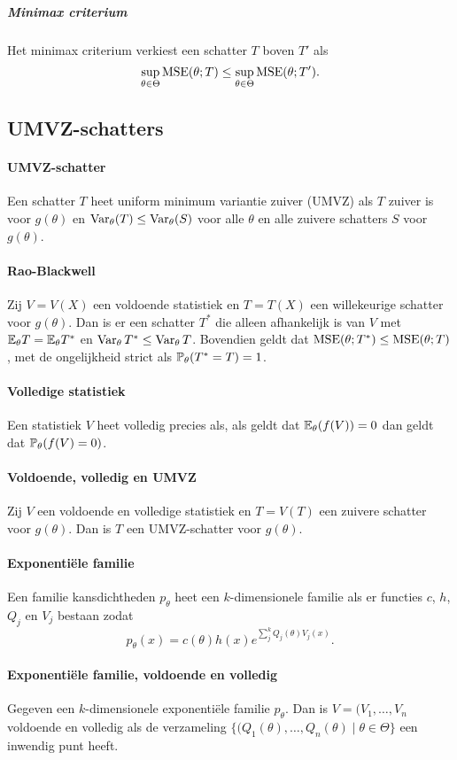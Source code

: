 \subparagraph{Minimax criterium} Het minimax criterium verkiest een schatter \(T\) boven \(T'\) als
\[
    \sup_{\theta\in\Theta}\operatorname{MSE}(\theta; T)\leq\sup_{\theta\in\Theta}\operatorname{MSE}(\theta;T').
\]

\subsection{UMVZ-schatters}
\paragraph{UMVZ-schatter} Een schatter \(T\) heet uniform minimum variantie zuiver (UMVZ) als \(T\) zuiver is voor \(g(\theta)\) en \(\operatorname{Var}_{\theta}(T)\leq\operatorname{Var}_{\theta}(S)\) voor alle \(\theta\) en alle zuivere schatters \(S\) voor \(g(\theta)\).

\paragraph{Rao-Blackwell} Zij \(V=V(X)\) een voldoende statistiek en \(T=T(X)\) een willekeurige schatter voor \(g(\theta)\). Dan is er een schatter \(T^{*}\) die alleen afhankelijk is van \(V\) met \(\mathbb{E}_{\theta}T=\mathbb{E}_{\theta}T^{*}\) en \(\operatorname{Var}_{\theta}T^{*}\leq\operatorname{Var}_{\theta}T\). Bovendien geldt dat \(\operatorname{MSE}(\theta;T^{*})\leq\operatorname{MSE}(\theta;T)\), met de ongelijkheid strict als \(\mathbb{P}_{\theta}(T^{*}=T)=1\).

\paragraph{Volledige statistiek} Een statistiek \(V\) heet volledig precies als, als geldt dat \(\mathbb{E}_{\theta}(f(V))=0\) dan geldt dat \(\mathbb{P}_{\theta}(f(V)=0)\).

\paragraph{Voldoende, volledig en UMVZ} Zij \(V\) een voldoende en volledige statistiek en \(T=V(T)\) een zuivere schatter voor \(g(\theta)\). Dan is \(T\) een UMVZ-schatter voor \(g(\theta)\).

\paragraph{Exponentiële familie} Een familie kansdichtheden \(p_{\theta}\) heet een \(k\)-dimensionele familie als er functies \(c\), \(h\), \(Q_{j}\) en \(V_{j}\) bestaan zodat
\[
    p_{\theta}(x)=c(\theta)h(x)e^{\sum_{j}^{k}Q_{j}(\theta)V_{j}(x)}.
\]

\paragraph{Exponentiële familie, voldoende en volledig} Gegeven een \(k\)-dimensionele exponentiële familie \(p_{\theta}\). Dan is \(V=(V_{1},\dots,V_{n}\) voldoende en volledig als de verzameling \(\{(Q_{1}(\theta),\dots,Q_{n}(\theta)\mid\theta\in\Theta\}\) een inwendig punt heeft.